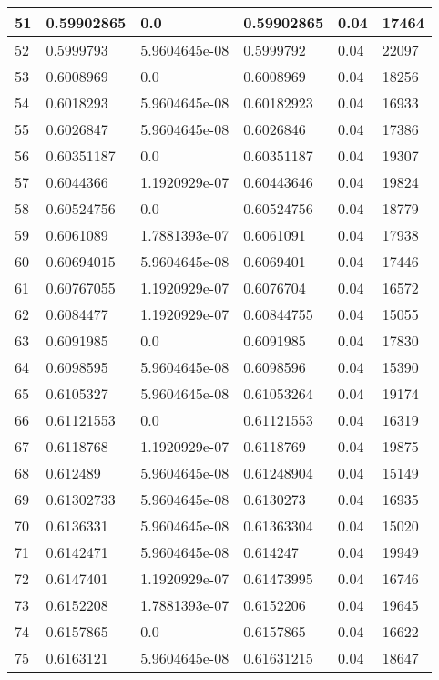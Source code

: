 \begin{longtable}{|l|l|l|l|l|l|}
51 & 0.59902865 & 0.0 & 0.59902865 & 0.04 & 17464 \\ \hline 
52 & 0.5999793 & 5.9604645e-08 & 0.5999792 & 0.04 & 22097 \\ \hline 
53 & 0.6008969 & 0.0 & 0.6008969 & 0.04 & 18256 \\ \hline 
54 & 0.6018293 & 5.9604645e-08 & 0.60182923 & 0.04 & 16933 \\ \hline 
55 & 0.6026847 & 5.9604645e-08 & 0.6026846 & 0.04 & 17386 \\ \hline 
56 & 0.60351187 & 0.0 & 0.60351187 & 0.04 & 19307 \\ \hline 
57 & 0.6044366 & 1.1920929e-07 & 0.60443646 & 0.04 & 19824 \\ \hline 
58 & 0.60524756 & 0.0 & 0.60524756 & 0.04 & 18779 \\ \hline 
59 & 0.6061089 & 1.7881393e-07 & 0.6061091 & 0.04 & 17938 \\ \hline 
60 & 0.60694015 & 5.9604645e-08 & 0.6069401 & 0.04 & 17446 \\ \hline 
61 & 0.60767055 & 1.1920929e-07 & 0.6076704 & 0.04 & 16572 \\ \hline 
62 & 0.6084477 & 1.1920929e-07 & 0.60844755 & 0.04 & 15055 \\ \hline 
63 & 0.6091985 & 0.0 & 0.6091985 & 0.04 & 17830 \\ \hline 
64 & 0.6098595 & 5.9604645e-08 & 0.6098596 & 0.04 & 15390 \\ \hline 
65 & 0.6105327 & 5.9604645e-08 & 0.61053264 & 0.04 & 19174 \\ \hline 
66 & 0.61121553 & 0.0 & 0.61121553 & 0.04 & 16319 \\ \hline 
67 & 0.6118768 & 1.1920929e-07 & 0.6118769 & 0.04 & 19875 \\ \hline 
68 & 0.612489 & 5.9604645e-08 & 0.61248904 & 0.04 & 15149 \\ \hline 
69 & 0.61302733 & 5.9604645e-08 & 0.6130273 & 0.04 & 16935 \\ \hline 
70 & 0.6136331 & 5.9604645e-08 & 0.61363304 & 0.04 & 15020 \\ \hline 
71 & 0.6142471 & 5.9604645e-08 & 0.614247 & 0.04 & 19949 \\ \hline 
72 & 0.6147401 & 1.1920929e-07 & 0.61473995 & 0.04 & 16746 \\ \hline 
73 & 0.6152208 & 1.7881393e-07 & 0.6152206 & 0.04 & 19645 \\ \hline 
74 & 0.6157865 & 0.0 & 0.6157865 & 0.04 & 16622 \\ \hline 
75 & 0.6163121 & 5.9604645e-08 & 0.61631215 & 0.04 & 18647 \\ \hline 
\end{longtable}